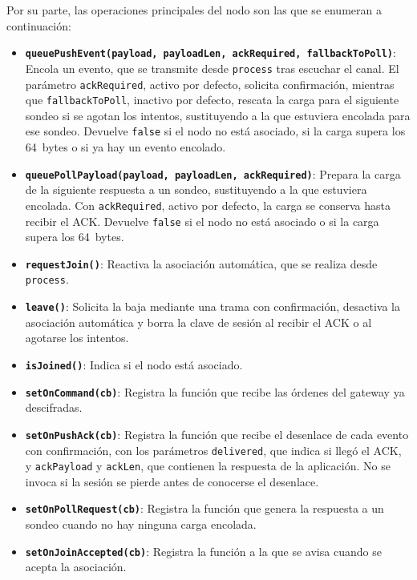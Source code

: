 Por su parte, las operaciones principales del nodo son las que se enumeran a continuación:

\begin{itemize}
\item \textbf{\texttt{queuePushEvent(payload, payloadLen, ackRequired, fallbackToPoll)}}: Encola un evento, que se transmite desde \texttt{process} tras escuchar el canal. El parámetro \texttt{ackRequired}, activo por defecto, solicita confirmación, mientras que \texttt{fallbackToPoll}, inactivo por defecto, rescata la carga para el siguiente sondeo si se agotan los intentos, sustituyendo a la que estuviera encolada para ese sondeo. Devuelve \texttt{false} si el nodo no está asociado, si la carga supera los 64~bytes o si ya hay un evento encolado.
\item \textbf{\texttt{queuePollPayload(payload, payloadLen, ackRequired)}}: Prepara la carga de la siguiente respuesta a un sondeo, sustituyendo a la que estuviera encolada. Con \texttt{ackRequired}, activo por defecto, la carga se conserva hasta recibir el ACK. Devuelve \texttt{false} si el nodo no está asociado o si la carga supera los 64~bytes.

\item \textbf{\texttt{requestJoin()}}: Reactiva la asociación automática, que se realiza desde \texttt{process}.

\item \textbf{\texttt{leave()}}: Solicita la baja mediante una trama con confirmación, desactiva la asociación automática y borra la clave de sesión al recibir el ACK o al agotarse los intentos. 
\item \textbf{\texttt{isJoined()}}: Indica si el nodo está asociado.
\item \textbf{\texttt{setOnCommand(cb)}}: Registra la función que recibe las órdenes del gateway ya descifradas.
\item \textbf{\texttt{setOnPushAck(cb)}}: Registra la función que recibe el desenlace de cada evento con confirmación, con los parámetros \texttt{delivered}, que indica si llegó el ACK, y \texttt{ackPayload} y \texttt{ackLen}, que contienen la respuesta de la aplicación. No se invoca si la sesión se pierde antes de conocerse el desenlace.
\item \textbf{\texttt{setOnPollRequest(cb)}}: Registra la función que genera la respuesta a un sondeo cuando no hay ninguna carga encolada.
\item \textbf{\texttt{setOnJoinAccepted(cb)}}: Registra la función a la que se avisa cuando se acepta la asociación.
\end{itemize}

